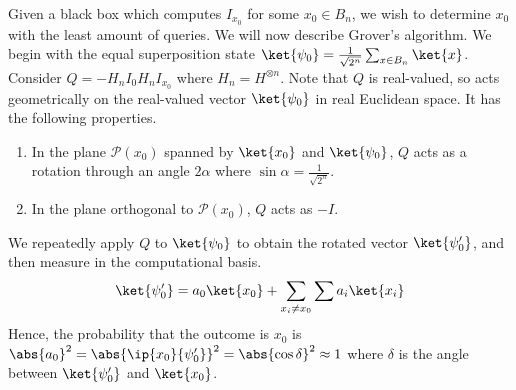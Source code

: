 Given a black box which computes $I_{x_0}$ for some $x_0 \in B_n$, we wish to determine $x_0$ with the least amount of queries.
We will now describe Grover's algorithm.
We begin with the equal superposition state $\ket{\psi_0} = \frac{1}{\sqrt{2^n}} \sum_{x \in B_n} \ket{x}$.
Consider  $Q = -H_n I_0 H_n I_{x_0}$ where $H_n = H^{\otimes n}$.
Note that $Q$ is real-valued, so acts geometrically on the real-valued vector $\ket{\psi_0}$ in real Euclidean space.
It has the following properties.
\begin{enumerate}
    \item In the plane $\mathcal P(x_0)$ spanned by $\ket{x_0}$ and $\ket{\psi_0}$, $Q$ acts as a rotation through an angle $2\alpha$ where $\sin \alpha = \frac{1}{\sqrt{2^n}}$.
    \item In the plane orthogonal to $\mathcal P(x_0)$, $Q$ acts as $-I$.
\end{enumerate}
We repeatedly apply $Q$ to $\ket{\psi_0}$ to obtain the rotated vector $\ket{\psi_0'}$, and then measure in the computational basis.
\[ \ket{\psi_0'} = a_0 \ket{x_0} + \sum_{x_i \neq x_0} \sum a_i \ket{x_i} \]
Hence, the probability that the outcome is $x_0$ is $\abs{a_0}^2 = \abs{\ip{x_0}{\psi_0'}}^2 = \abs{\cos \delta}^2 \approx 1$ where $\delta$ is the angle between $\ket{\psi_0'}$ and $\ket{x_0}$.

